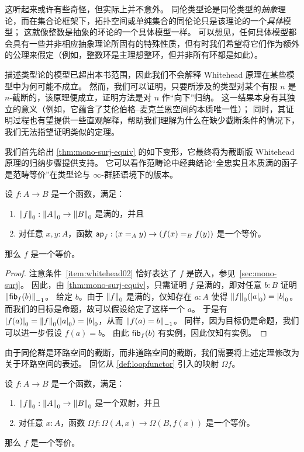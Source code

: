 这听起来或许有些奇怪，但实际上并不意外。
同伦类型论是同伦类型的\emph{抽象}理论，而在集合论框架下，拓扑空间或单纯集合的同伦论只是该理论的一个\emph{具体}模型；
这就像整数是抽象的环论的一个具体模型一样。
可以想见，任何具体模型都会具有一些并非相应抽象理论所固有的特殊性质，但有时我们希望将它们作为额外的公理来假定（例如，整数环是主理想整环，但并非所有环都是如此）。

描述类型论的模型已超出本书范围，因此我们不会解释 Whitehead 原理在某些模型中为何可能不成立。
然而，我们可以证明，只要所涉及的类型对某个有限 $n$ 是 $n$-截断的，该原理便成立，证明方法是对 $n$ 作“向下”归纳。
这一结果本身有其独立的意义（例如，它蕴含了艾伦伯格–麦克兰恩空间的本质唯一性）；
同时，其证明过程也有望提供一些直观解释，帮助我们理解为什么在缺少截断条件的情况下，我们无法指望证明类似的定理。

我们首先给出 \cref{thm:mono-surj-equiv} 的如下变形，它最终将为截断版 Whitehead 原理的归纳步骤提供支持。
它可以看作范畴论中经典结论“全忠实且本质满的函子是范畴等价”在类型论与 $\infty$-群胚语境下的版本。

\begin{thm}\label{thm:whitehead0}
  设 $f:A\to B$ 是一个函数，满足：
  \begin{enumerate}
  \item $\trunc0 f : \trunc0 A \to \trunc0 B$ 是满的，并且\label{item:whitehead01}
  \item 对任意 $x,y:A$，函数 $\apfunc f : (\id[A]xy) \to (\id[B]{f(x)}{f(y)})$ 是一个等价。\label{item:whitehead02}
  \end{enumerate}
  那么 $f$ 是一个等价。
\end{thm}

\begin{proof}
  注意条件~\ref{item:whitehead02} 恰好表达了 $f$ 是嵌入，参见~\cref{sec:mono-surj}。
  因此，由 \cref{thm:mono-surj-equiv}，只需证明 $f$ 是满的，即对任意 $b:B$ 证明 $\trunc{-1}{\hfib f b}$。
  给定 $b$。由于 $\trunc0 f$ 是满的，仅知存在 $a:A$ 使得 $\trunc 0 f(\tproj0a) = \tproj0b$。
  而我们的目标是命题，故可以假设给定了这样一个 $a$。
  于是有 $\tproj0{f(a)} = \trunc 0 f(\tproj0a) =\tproj0b$，从而 $\trunc{-1}{f(a)=b}$。
  同样，因为目标仍是命题，我们可以进一步假设 $f(a)=b$。
  由此 $\hfib f b$ 有实例，因此仅知有实例。
\end{proof}

由于同伦群是环路空间的截断，而非道路空间的截断，我们需要将上述定理修改为关于环路空间的表述。
回忆从 \cref{def:loopfunctor} 引入的映射 $\Omega f$。

\begin{cor}\label{thm:whitehead1}
  设 $f:A\to B$ 是一个函数，满足：
  \begin{enumerate}
  \item $\trunc0 f : \trunc0 A \to \trunc0 B$ 是一个双射，并且
  \item 对任意 $x:A$，函数 $\Omega f : \Omega(A,x) \to \Omega(B,f(x))$ 是一个等价。
  \end{enumerate}
  那么 $f$ 是一个等价。
\end{cor}

